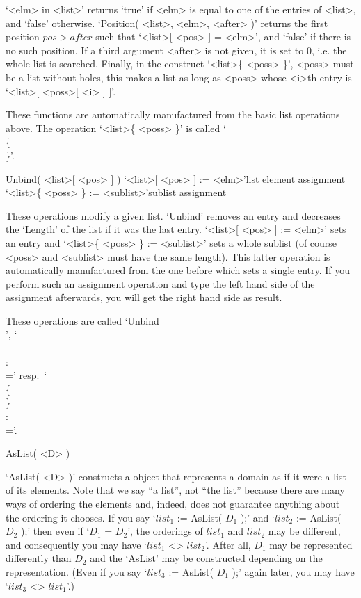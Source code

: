 `<elm> in <list>' returns `true' if <elm> is equal to  one of the entries
of  <list>, and `false'  otherwise. `Position( <list>,  <elm>, <after> )'
returns the first position $pos  > after$  such  that `<list>[ <pos> ]  =
<elm>', and `false' if  there is no  such  position. If a third  argument
<after> is  not given, it is  set to 0, i.e.  the whole list is searched.
Finally, in  the construct `<list>\{  <poss> \}',  <poss> must  be a list
without holes, this makes a  list as long as <poss>  whose <i>th entry is
`<list>[ <poss>[ <i> ] ]'.

These  functions  are automatically  manufactured    from the basic  list
operations   above.  The  operation  `<list>\{    <poss>  \}' is   called
`\\\{\\\}'.

\>Unbind( <list>[ <pos> ] )
\>`<list>[ <pos> ] := <elm>'{list element assignment}
\>`<list>\{ <poss> \} := <sublist>'{sublist assignment}

These   operations modify a  given  list.  `Unbind'  removes an entry and
decreases  the `Length' of the list  if it was  the  last entry. `<list>[
<pos> ]  := <elm>' sets an  entry  and `<list>\{ <poss> \}  := <sublist>'
sets a whole sublist  (of course <poss> and <sublist>  must have the same
length). This latter operation is automatically manufactured from the one
before  which sets a  single entry.  If  you  perform such an  assignment
operation and type  the left hand side of  the assignment afterwards, you
will get the right hand side as result.

These     operations      are    called   `Unbind\\[\\]',  `\\[\\]\\:\\='
resp.~`\\\{\\\}\\:\\='.

\null

\>AsList( <D> )

`AsList( <D> )' constructs a {\GAP} object that represents a domain as if
it  were a list  of its elements. Note that  we say ``a list'', not ``the
list'' because there are many ways of ordering  the elements and, indeed,
{\GAP} does not guarantee anything about the  ordering it chooses. If you
say `$list_1$ :=  AsList( $D_1$ );'  and `$list_2$  := AsList( $D_2$  );'
then even if `$D_1$ = $D_2$', the  orderings of $list_1$ and $list_2$ may
be different, and consequently you may have `$list_1$ <> $list_2$'. After
all, $D_1$ may be represented differently than $D_2$ and the `AsList' may
be constructed   depending  on the   representation.   (Even if you   say
`$list_3$ := AsList(  $D_1$ );' again  later,  you may have `$list_3$  <>
$list_1$'.)

